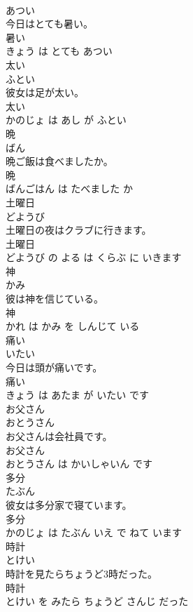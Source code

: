 \documentclass[8pt]{extreport}
\begin{document}
\begin{CJK}{UTF8}{min}
\\	あつい			
\\	今日はとても暑い。	
\\	暑い 
\\	きょう は とても あつい			
\\	太い	
\\	ふとい			
\\	彼女は足が太い。	
\\	太い 
\\	かのじょ は あし が ふとい			
\\	晩	
\\	ばん			
\\	晩ご飯は食べましたか。	
\\	晩 
\\	ばんごはん は たべました か			
\\	土曜日	
\\	どようび			
\\	土曜日の夜はクラブに行きます。	
\\	土曜日 
\\	どようび の よる は くらぶ に いきます			
\\	神	
\\	かみ			
\\	彼は神を信じている。	
\\	神 
\\	かれ は かみ を しんじて いる			
\\	痛い	
\\	いたい			
\\	今日は頭が痛いです。	
\\	痛い 
\\	きょう は あたま が いたい です			
\\	お父さん	
\\	おとうさん			
\\	お父さんは会社員です。	
\\	お父さん 
\\	おとうさん は かいしゃいん です			
\\	多分	
\\	たぶん			
\\	彼女は多分家で寝ています。	
\\	多分 
\\	かのじょ は たぶん いえ で ねて います			
\\	時計	
\\	とけい			
\\	時計を見たらちょうど3時だった。	
\\	時計 
\\	とけい を みたら ちょうど さんじ だった			

\end{CJK}
\end{document}

